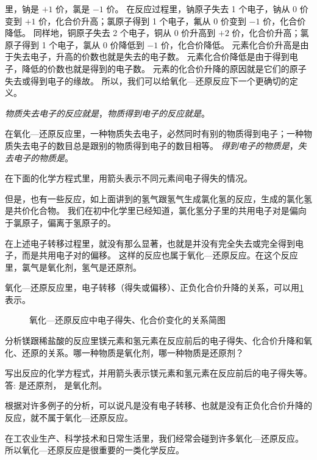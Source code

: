  里，钠是 $+1$ 价，氯是 $-1$ 价。
在反应过程里，钠原子失去 1 个电子，钠从 0 价变到 $+1$ 价，化合价升高；氯原子得到 1 个电子，氟从 0 价变到 $-1$ 价，化合价降低。
同样地，铜原子失去 2 个电子，铜从 0 价升高到 $+2$ 价，化合价升高；氯原子得到 1 个电子，氯从 0 价降低到 $-1$ 价，化合价降低。
元素化合价升高是由于失去电子，升高的价数也就是失去的电子数。
元素化合价降低是由于得到电子，降低的价数也就是得到的电子数。
元素的化合价升降的原因就是它们的原子失去或得到电子的缘故。
所以，我们可以给氧化—还原反应下一个更确切的定义。

\emph{物质失去电子的反应就是}，\emph{物质得到电子的反应就是}。

在氧化—还原反应里，一种物质失去电子，必然同时有别的物质得到电子；一种物质失去电子的数目总是跟别的物质得到电子的数目相等。
\emph{得到电子的物质是}，\emph{失去电子的物质是}。

在下面的化学方程式里，用箭头表示不同元素间电子得失的情况。


但是，也有一些反应，如上面讲到的氢气跟氢气生成氯化氢的反应，生成的氯化氢是共价化合物。
我们在初中化学里已经知道，氯化氢分子里的共用电子对是偏向于氯原子，偏离于氢原子的。


在上述电子转移过程里，就没有那么显著，也就是并没有完全失去或完全得到电子，而是共用电子对的偏移。
这样的反应也属于氧化—还原反应。在这个反应里，氯气是氧化剂，氢气是还原剂。

氧化—还原反应里，电子转移（得失或偏移）、正负化合价升降的关系，可以用\cref{fig:2-11} 表示。
\begin{figure}
  \caption{氧化—还原反应中电子得失、化合价变化的关系简图}\label{fig:2-11}
\end{figure}

\begin{example}
  分析镁跟稀盐酸的反应里镁元素和氢元素在反应前后的电子得失、化合价升降和氧化、还原的关系。哪一种物质是氧化剂，哪一种物质是还原剂？
\end{example}
\begin{solution}
  写出反应的化学方程式，并用箭头表示镁元素和氢元素在反应前后的电子得失等。
  \[ \]
  答:  是还原剂， 是氧化剂。
\end{solution}

根据对许多例子的分析，可以说凡是没有电子转移、也就是没有正负化合价升降的反应，就不属于氧化—还原反应。

在工农业生产、科学技术和日常生活里，我们经常会碰到许多氧化—还原反应。
所以氧化—还原反应是很重要的一类化学反应。

